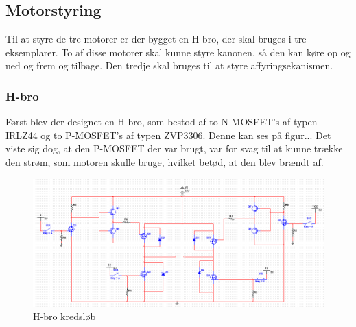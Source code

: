 \subsection{Motorstyring}
Til at styre de tre motorer er der bygget en H-bro, der skal bruges i tre eksemplarer. To af disse motorer skal kunne styre kanonen, så den kan køre op og ned og frem og tilbage. Den tredje skal bruges til at styre affyringsekanismen. 

\subsubsection{H-bro}
Først blev der designet en H-bro, som bestod af to N-MOSFET's af typen IRLZ44 og to P-MOSFET's af typen ZVP3306. Denne kan ses på figur... Det viste sig dog, at den P-MOSFET der var brugt, var for svag til at kunne trække den strøm, som motoren skulle bruge, hvilket betød, at den blev brændt af. 


\begin{figure}[H]
	\centering
	\includegraphics[width=\textwidth]{DesignOgImplementering/images/motorkreds}
	\caption{H-bro kredsløb}
	\end{figure}

